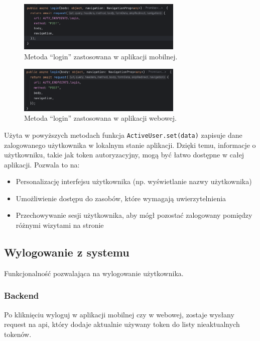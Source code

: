 \begin{figure}[H]
    \centering
    \includegraphics[width=0.7\textwidth]{chapters/chapter_8/screens/logowanie_mobile}
    \caption{Metoda “login” zastosowana w aplikacji mobilnej.}
    \label{img:logowanie_mobile}
\end{figure}

\begin{figure}[H]
    \centering
    \includegraphics[width=0.7\textwidth]{chapters/chapter_8/screens/logowanie_web}
    \caption{Metoda “login” zastosowana w aplikacji webowej.}
    \label{img:logowanie_web}
\end{figure}

Użyta w powyższych metodach funkcja \texttt{ActiveUser.set(data)} zapisuje dane zalogowanego użytkownika w lokalnym stanie aplikacji. Dzięki temu, informacje o użytkowniku, takie jak token autoryzacyjny, mogą być łatwo dostępne w całej aplikacji. Pozwala to na:

\begin{itemize}
    \item Personalizację interfejsu użytkownika (np. wyświetlanie nazwy użytkownika)
    \item Umożliwienie dostępu do zasobów, które wymagają uwierzytelnienia
    \item Przechowywanie sesji użytkownika, aby mógł pozostać zalogowany pomiędzy różnymi wizytami na stronie
\end{itemize}

\subsection{Wylogowanie z systemu}
Funkcjonalność pozwalająca na wylogowanie użytkownika.

\subsubsection{Backend}
Po kliknięciu wyloguj w aplikacji mobilnej czy w webowej, zostaje wysłany request na api, który dodaje aktualnie używany token do listy nieaktualnych tokenów.

